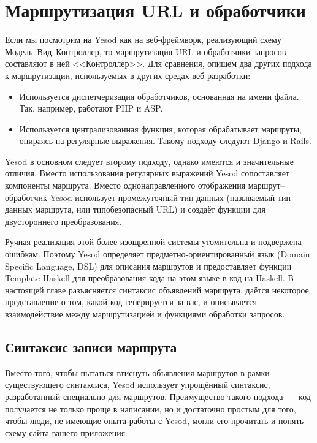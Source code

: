 \chapter{Маршрутизация URL и обработчики}\label{chap:routing}

Если мы посмотрим на Yesod как на веб-фреймворк, реализующий схему
Модель--Вид--Контроллер, то маршрутизация URL и обработчики запросов составляют в ней
<<Контроллер>>. Для сравнения, опишем два других подхода к маршрутизации, используемых в
других средах веб-разработки:
\begin{itemize}
\item Используется диспетчеризация обработчиков, основанная на имени файла. Так, например,
  работают PHP и ASP.
\item Используется централизованная функция, которая обрабатывает маршруты, опираясь на
  регулярные выражения. Такому подходу следуют Django и Rails.
\end{itemize}

Yesod в основном следует второму подходу, однако имеются и значительные отличия. Вместо
использования регулярных выражений Yesod сопоставляет компоненты маршрута. Вместо
однонаправленного отображения маршрут--обработчик Yesod использует промежуточный тип
данных (называемый тип данных маршрута, или типобезопасный URL) и создаёт функции для
двустороннего преобразования.

Ручная реализация этой более изощренной системы утомительна и подвержена ошибкам. Поэтому
Yesod определяет предметно-ориентированный язык (Domain Specific Language, DSL) для
описания маршрутов и предоставляет функции Template Haskell для преобразования кода на
этом языке в код на Haskell. В настоящей главе разъясняется синтаксис объявлений маршрута,
даётся некоторое представление о том, какой код генерируется за вас, и описывается
взаимодействие между маршрутизацией и функциями обработки запросов.

\section{Синтаксис записи маршрута}

Вместо того, чтобы пытаться втиснуть объявления маршрутов в рамки существующего
синтаксиса, Yesod использует упрощённый синтаксис, разработанный специально для
маршрутов. Преимущество такого подхода~--- код получается не только проще в написании, но
и достаточно простым для того, чтобы люди, не имеющие опыта работы с Yesod, могли
его прочитать и понять схему сайта вашего приложения.

